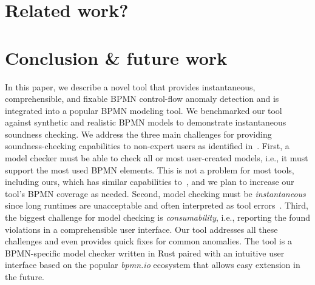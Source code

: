 \documentclass[
twocolumn,
]{ceurart}
\begin{document}
\section{Related work?}

\section{Conclusion \& future work}

In this paper, we describe a novel tool that provides instantaneous, comprehensible, and fixable BPMN control-flow anomaly detection and is integrated into a popular BPMN modeling tool.
We benchmarked our tool against synthetic and realistic BPMN models to demonstrate instantaneous soundness checking.
We address the three main challenges for providing soundness-checking capabilities to non-expert users as identified in~\cite{fahlandAnalysisDemandInstantaneous2011}.
First, a model checker must be able to check all or most user-created models, i.e., it must support the most used BPMN elements.
This is not a problem for most tools, including ours, which has similar capabilities to~\cite{corradiniFormalApproachAnalysis2021}, and we plan to increase our tool's BPMN coverage as needed.
Second, model checking must be \textit{instantaneous} since long runtimes are unacceptable and often interpreted as tool errors~\cite{fahlandAnalysisDemandInstantaneous2011}.
Third, the biggest challenge for model checking is \textit{consumability}, i.e., reporting the found violations in a comprehensible user interface.
Our tool addresses all these challenges and even provides quick fixes for common anomalies.
The tool is a BPMN-specific model checker written in Rust paired with an intuitive user interface based on the popular \textit{bpmn.io} ecosystem that allows easy extension in the future.



\end{document}

